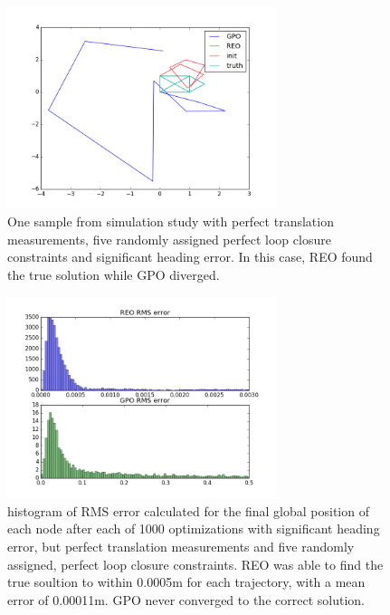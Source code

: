 
 \begin{figure}[H]
   \includegraphics[width=0.7\textwidth]{figures/GPO_diverged.png}
   \caption{One sample from simulation study with perfect translation measurements, five randomly assigned perfect loop closure constraints and significant heading error.  In this case, REO found the true solution while GPO diverged.}
   \label{fig:GPO_heading_divergence}
 \end{figure}

 \begin{figure}[H]
   \includegraphics[width=0.7\textwidth]{figures/GPO_vs_REO_bad.png}
   \caption{histogram of RMS error calculated for the final global position of each node after each of 1000 optimizations with significant heading error, but perfect translation measurements and five randomly assigned, perfect loop closure constraints.  REO was able to find the true soultion to within 0.0005m for each trajectory, with a mean error of 0.00011m.  GPO never converged to the correct solution.}
   \label{fig:GPO_bad_histogram}
 \end{figure}

